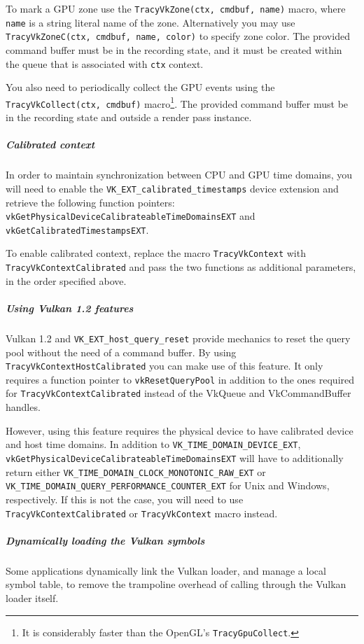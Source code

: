 \documentclass[hidelinks,titlepage,a4paper]{article}
\begin{document}
To mark a GPU zone use the \texttt{TracyVkZone(ctx, cmdbuf, name)} macro, where \texttt{name} is a string literal name of the zone. Alternatively you may use \texttt{TracyVkZoneC(ctx, cmdbuf, name, color)} to specify zone color. The provided command buffer must be in the recording state, and it must be created within the queue that is associated with \texttt{ctx} context.

You also need to periodically collect the GPU events using the \texttt{TracyVkCollect(ctx, cmdbuf)} macro\footnote{It is considerably faster than the OpenGL's \texttt{TracyGpuCollect}.}. The provided command buffer must be in the recording state and outside a render pass instance.

\subparagraph{Calibrated context}

In order to maintain synchronization between CPU and GPU time domains, you will need to enable the \texttt{VK\_EXT\_calibrated\_timestamps} device extension and retrieve the following function pointers: \texttt{vkGetPhysicalDeviceCalibrateableTimeDomainsEXT} and \texttt{vkGetCalibratedTimestampsEXT}.

To enable calibrated context, replace the macro \texttt{TracyVkContext} with \texttt{TracyVkContextCalibrated} and pass the two functions as additional parameters, in the order specified above.

\subparagraph{Using Vulkan 1.2 features}

Vulkan 1.2 and \texttt{VK\_EXT\_host\_query\_reset} provide mechanics to reset the query pool without the need of a command buffer. By using \texttt{TracyVkContextHostCalibrated} you can make use of this feature. It only requires a function pointer to \texttt{vkResetQueryPool} in addition to the ones required for \texttt{TracyVkContextCalibrated} instead of the VkQueue and VkCommandBuffer handles.

However, using this feature requires the physical device to have calibrated device and host time domains. In addition to \texttt{VK\_TIME\_DOMAIN\_DEVICE\_EXT}, \texttt{vkGetPhysicalDeviceCalibrateableTimeDomainsEXT} will have to additionally return either \texttt{VK\_TIME\_DOMAIN\_CLOCK\_MONOTONIC\_RAW\_EXT} or \texttt{VK\_TIME\_DOMAIN\_QUERY\_PERFORMANCE\_COUNTER\_EXT} for Unix and Windows, respectively. If this is not the case, you will need to use \texttt{TracyVkContextCalibrated} or \texttt{TracyVkContext} macro instead.

\subparagraph{Dynamically loading the Vulkan symbols}

Some applications dynamically link the Vulkan loader, and manage a local symbol table, to remove the trampoline overhead of calling through the Vulkan loader itself.
\end{document}
